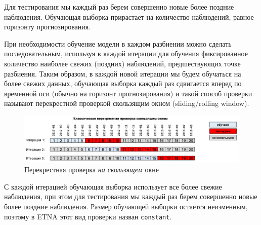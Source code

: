 \documentclass[%
	11pt,
	a4paper,
	utf8,
		]{article}
\begin{document}
Для тестирования мы каждый раз берем совершенно новые более поздние наблюдения. Обучающая выборка прирастает на количество наблюдений, равное горизонту прогнозирования.

При необходимости обучение модели в каждом разбиении можно сделать последовательным, используя в каждой итерации для обучения фиксированное количество наиболее свежих (поздних) наблюдений, предшествующих точке разбиения. Таким образом, в каждой новой итерации мы будем обучаться на более свежих данных, обучающая выборка каждый раз сдвигается вперед по временной оси (обычно на горизонт прогнозирования) и такой способ проверки называют перекрестной проверкой скользящим окном (sliding/rolling window).

\begin{figure}[h]
	\centering
	\includegraphics[scale=0.3]{figures/cross_val_rol_ts.png}
	\caption{ Перекрестная проверка \emph{на скользящем} окне }\label{fig:cross_val_rol_ts}
\end{figure}

С каждой итерацией обучающая выборка использует все более свежие наблюдения, при этом для тестирования мы каждый раз берем совершенно новые более поздние наблюдения. Размер обучающей выборки остается неизменным, поэтому в ETNA этот вид проверки назван \verb|constant|.
\end{document}
